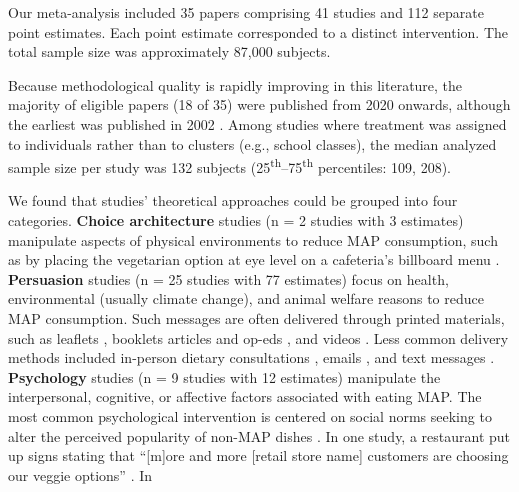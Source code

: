 \documentclass[sn-nature,referee,lineno,pdflatex]{sn-jnl}
\begin{document}
Our meta-analysis included 35 papers comprising 41 studies and 112
separate point estimates. Each point estimate corresponded to a distinct
intervention. The total sample size was approximately 87,000 subjects.

Because methodological quality is rapidly improving in this literature,
the majority of eligible papers (18 of 35) were published from 2020
onwards, although the earliest was published in 2002 \citep{allen2002}.
Among studies where treatment was assigned to individuals rather than to
clusters (e.g., school classes), the median analyzed sample size per
study was 132 subjects (25\textsuperscript{th}--75\textsuperscript{th}
percentiles: 109, 208).

We found that studies' theoretical approaches could be grouped into four
categories. \textbf{Choice architecture} studies
\citep{andersson2021, kanchanachitra2020} (n = 2 studies with 3
estimates) manipulate aspects of physical environments to reduce MAP
consumption, such as by placing the vegetarian option at eye level on a
cafeteria's billboard menu \citep{andersson2021}. \textbf{Persuasion}
studies
\citep{kanchanachitra2020, aberman2018, abrahamse2007, acharya2004, banerjee2019, bianchi2022, bochmann2017, bschaden2020, carfora2023, hennessy2016, piester2020, cooney2014, cooney2016, feltz2022, haile2021, hatami2018, jalil2023, mathur2021effectiveness, merrill2009, norris2014, peacock2017, polanco2022, sparkman2021, weingarten2022}
(n = 25 studies with 77 estimates) focus on health, environmental
(usually climate change), and animal welfare reasons to reduce MAP
consumption. Such messages are often delivered through printed
materials, such as leaflets \citep{haile2021, polanco2022}, booklets
\citep{bianchi2022} articles and op-eds \citep{sparkman2021, feltz2022},
and videos \citep{sparkman2021, cooney2016, mathur2021effectiveness}.
Less common delivery methods included in-person dietary consultations
\citep{merrill2009}, emails \citep{banerjee2019}, and text messages
\citep{carfora2023}. \textbf{Psychology} studies
\citep{aldoh2023, allen2002, camp2019, coker2022, piester2020, sparkman2020}
(n = 9 studies with 12 estimates) manipulate the interpersonal,
cognitive, or affective factors associated with eating MAP. The most
common psychological intervention is centered on social norms seeking to
alter the perceived popularity of non-MAP dishes
\citep{sparkman2020, sparkman2021}. In one study, a restaurant put up
signs stating that ``{[}m{]}ore and more {[}retail store name{]}
customers are choosing our veggie options'' \citep{coker2022}. In
\end{document}
